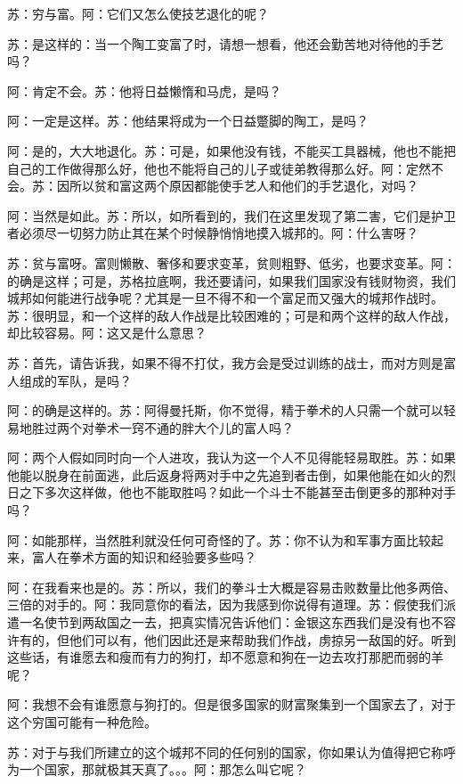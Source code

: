 \documentclass[11pt,oneside]{book}
\begin{document}
\begin{common-format}
苏：穷与富。阿：它们又怎么使技艺退化的呢？

苏：是这样的：当一个陶工变富了时，请想一想看，他还会勤苦地对待他的手艺吗？

阿：肯定不会。苏：他将日益懒惰和马虎，是吗？

阿：一定是这样。苏：他结果将成为一个日益蹩脚的陶工，是吗？

    阿：是的，大大地退化。苏：可是，如果他没有钱，不能买工具器械，他也不能把自己的工作做得那么好，他也不能将自己的儿子或徒弟教得那么好。阿：定然不会。苏：因所以贫和富这两个原因都能使手艺人和他们的手艺退化，对吗？

    阿：当然是如此。苏：所以，如所看到的，我们在这里发现了第二害，它们是护卫者必须尽一切努力防止其在某个时候静悄悄地摸入城邦的。阿：什么害呀？

    苏：贫与富呀。富则懒散、奢侈和要求变革，贫则粗野、低劣，也要求变革。阿：的确是这样；可是，苏格拉底啊，我还要请问，如果我们国家没有钱财物资，我们城邦如何能进行战争呢？尤其是一旦不得不和一个富足而又强大的城邦作战时。苏：很明显，和一个这样的敌人作战是比较困难的；可是和两个这样的敌人作战，却比较容易。阿：这又是什么意思？

    


    苏：首先，请告诉我，如果不得不打仗，我方会是受过训练的战士，而对方则是富人组成的军队，是吗？

    阿：的确是这样的。苏：阿得曼托斯，你不觉得，精于拳术的人只需一个就可以轻易地胜过两个对拳术一窍不通的胖大个儿的富人吗？

    阿：两个人假如同时向一个人进攻，我认为这一个人不见得能轻易取胜。苏：如果他能以脱身在前面逃，此后返身将两对手中之先追到者击倒，如果他能在如火的烈日之下多次这样做，他也不能取胜吗？如此一个斗士不能甚至击倒更多的那种对手吗？

    阿：如能那样，当然胜利就没任何可奇怪的了。苏：你不认为和军事方面比较起来，富人在拳术方面的知识和经验要多些吗？

    阿：在我看来也是的。苏：所以，我们的拳斗士大概是容易击败数量比他多两倍、三倍的对手的。阿：我同意你的看法，因为我感到你说得有道理。苏：假使我们派遣一名使节到两敌国之一去，把真实情况告诉他们：金银这东西我们是没有也不容许有的，但他们可以有，他们因此还是来帮助我们作战，虏掠另一敌国的好。听到这些话，有谁愿去和瘦而有力的狗打，却不愿意和狗在一边去攻打那肥而弱的羊呢？

    阿：我想不会有谁愿意与狗打的。但是很多国家的财富聚集到一个国家去了，对于这个穷国可能有一种危险。

    



    苏：对于与我们所建立的这个城邦不同的任何别的国家，你如果认为值得把它称呼为一个国家，那就极其天真了。。。阿：那怎么叫它呢？


\end{common-format}
\end{document}
